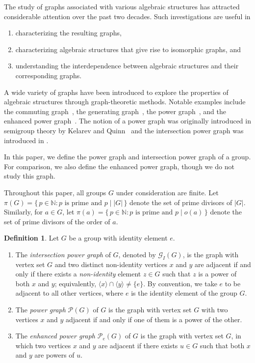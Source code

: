 \documentclass[12pt]{amsart}
\theoremstyle{plain}
\theoremstyle{remark}
\theoremstyle{definition}
\newtheorem{defn}{Definition}[section]
\begin{document}
The study of graphs associated with various algebraic structures has attracted 
considerable attention over the past two decades. Such investigations are useful in 
\begin{enumerate}
    \item characterizing the resulting graphs,
    \item characterizing algebraic structures that give rise to isomorphic graphs, and
    \item understanding the interdependence between algebraic structures and their 
    corresponding graphs.
\end{enumerate}
A wide variety of graphs have been introduced to explore the properties of 
algebraic structures through graph-theoretic methods. Notable examples include 
the commuting graph~\cite{Brauer-Fowler}, the generating graph~\cite{Guralnick-Kantor_generating-graph}, 
the power graph~\cite{undpwrgraphofsemgmainsgc1,powergraph}, and the enhanced power graph~\cite{aacns,bera-dey-JGT,Bera-Dey-Mukherjee}. 
The notion of a power graph was originally introduced in semigroup theory by 
Kelarev and Quinn~\cite{Kelarev-Quinn-2000} and the intersection power graph was introduced in \cite{intersectionpwegraphb3}.



In this paper, we define the power graph and intersection power graph of a group. For 
comparison, we also define the enhanced power graph, though we do not study
this graph.

Throughout this paper, all groups $G$ under consideration are finite. Let
$\pi(G) = \{\, p \in \mathbb{N} : p \text{ is prime and } p \mid |G| \,\}$
denote the set of prime divisors of $|G|$. Similarly, for $a \in G$, let
$\pi(a) = \{\, p \in \mathbb{N} : p \text{ is prime and } p \mid o(a) \,\}$
denote the set of prime divisors of the order of $a$.

\begin{defn}\label{Def:ipg}\cite{intersectionpwegraphb3} 
Let $G$ be a group with identity element $e$.
\begin{enumerate}
\item The \emph{intersection  power graph} of $G$, denoted by $\mathcal{G}_I(G)$,  is the graph with vertex set $G$ and two distinct non-identity vertices $x$ and $y$ are adjacent if and only if there exists a \emph{non-identity} element $z\in G$
such that $z$ is a power of both $x$ and $y$; equivalently, $\langle x\rangle\cap \langle y\rangle \neq \{e\}$. By convention, we take $e$ to be adjacent to all other vertices, where $e$ is the identity element of the group $G$.   
\item
The \emph{power graph} $\mathcal{P}(G)$ of $G$ is the graph with vertex set $G$ 
with two vertices $x$ and $y$ adjacent if and only if one of them is a power of the other.   
\item
The \emph{enhanced power graph} $\mathcal{P}_e(G)$ of $G$ is the graph with 
vertex set $G$, in which two vertices $x$ and $y$ are adjacent if there exists
$u\in G$ such that both $x$ and $y$ are powers of $u$.
\end{enumerate}
\end{defn}
\end{document}

